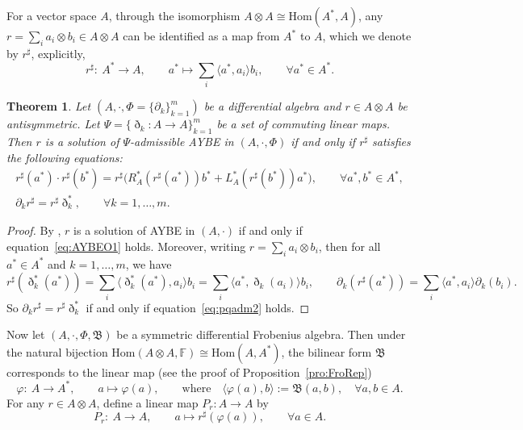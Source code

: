 \documentclass[pdftex]{sigma}
\numberwithin{equation}{section}
\newtheorem{Theorem}{Theorem}[section]
\newcommand{\Hom}{\mathrm{Hom}}
\begin{document}
For a vector space $A$, through the isomorphism $A \otimes A \cong \Hom(A^*,A)$, any $r = \sum_{i} a_i \otimes b_i \in A \otimes A$ can be identified as a map from $A^*$ to $A$, which we denote by $r^\sharp$, explicitly,
\begin{equation*}
 r^\sharp\colon \ A^* \to A, \qquad a^* \mapsto \sum_{i} \langle a^*, a_i \rangle b_i, \qquad
 \forall a^* \in A^*.
\end{equation*}

\begin{Theorem}\label{thm:AYBEO}
 Let $(A, \cdot, \Phi = \{\partial_k\}_{k=1}^m)$ be a differential algebra and $r \in A \otimes A$ be antisymmetric.
 Let $\Psi = \{\eth_k\colon A \to A\}_{k=1}^m$ be a set of commuting linear maps.
 Then $r$ is a solution of $\Psi$-admissible AYBE in $(A, \cdot, \Phi)$ if and only if $r^\sharp$
 satisfies the following equations:
 \begin{gather}
 r^\sharp(a^*) \cdot r^\sharp(b^*) = r^\sharp\big( R^*_A(r^\sharp(a^*)) b^* + L^*_A(r^\sharp(b^*)) a^* \big), \qquad \forall a^*, b^* \in A^*, \label{eq:AYBEO1} \\
 \partial_k r^\sharp = r^\sharp \eth_k^*, \qquad \forall k=1, \dots, m. \label{eq:AYBEO2}
 \end{gather}
\end{Theorem}
\begin{proof}
 By \cite[Proposition~2.4.7]{BaiDouble},
 $r$ is a solution of AYBE in $(A, \cdot)$ if and only if equation~\eqref{eq:AYBEO1} holds.
 Moreover, writing $r = \sum_i a_i \otimes b_i$, then for all $a^* \in A^*$ and $k=1, \dots,
 m$, we have
 \begin{equation*}
 r^\sharp(\eth_k^*(a^*)) = \sum_{i} \langle \eth_k^*(a^*), a_i \rangle b_i = \sum_{i} \langle a^*, \eth_k(a_i) \rangle b_i, \qquad \partial_k(r^\sharp(a^*)) = \sum_{i}\langle a^*, a_i \rangle \partial_k(b_i).
 \end{equation*}
 So $\partial_k r^\sharp = r^\sharp \eth_k^*$ if and only if equation~\eqref{eq:pqadm2} holds.
\end{proof}


Now let $(A, \cdot, \Phi, \mathfrak{B})$ be a symmetric
differential Frobenius algebra. Then under the natural bijection
$\Hom(A \otimes A, \mathbb{F}) \cong \Hom(A, A^*)$, the bilinear
form $\mathfrak{B}$ corresponds to the linear map (see the proof
of Proposition~\ref{pro:FroRep})
\begin{equation*}
 \varphi\colon \ A \to A^*, \qquad a \mapsto \varphi(a),\qquad
 \text{where} \quad \langle \varphi(a), b \rangle := \mathfrak{B}(a, b), \quad
 \forall a, b \in A.
\end{equation*}
For any $r \in A \otimes A$, define a linear map $P_r\colon A \to A$ by
\begin{equation*}
 P_r\colon \ A \to A, \qquad a \mapsto r^\sharp(\varphi(a)), \qquad \forall a \in A.
\end{equation*}
\end{document}
